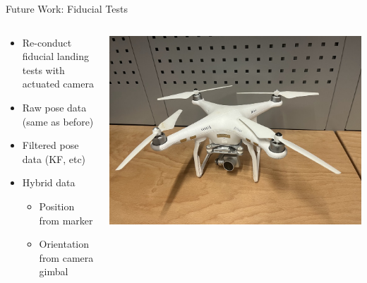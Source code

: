 \documentclass[aspectratio=169]{beamer}
\begin{document}
%
%
%
\begin{frame}{Future Work: Fiducial Tests}
\begin{columns}
	\begin{column}{0.5\textwidth}
	\begin{itemize}
		\item Re-conduct fiducial landing tests with actuated camera
		\item Raw pose data (same as before)
		\item Filtered pose data (KF, etc)
		\item Hybrid data
		\begin{itemize}
			\item Position from marker
			\item Orientation from camera gimbal
		\end{itemize}
	\end{itemize}
	\end{column}
	\begin{column}{0.5\textwidth}
		\includegraphics[width=\textwidth]{./images/phantom_3}
	\end{column}
\end{columns}
\end{frame}
\end{document}
